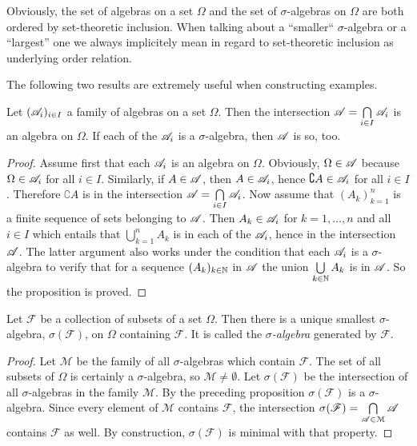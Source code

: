 \begin{remark}
  Obviously, the set of algebras on a set $\Omega$ and the set of $\sigma$-algebras on $\Omega$ are both ordered
  by set-theoretic inclusion. When talking about a ``smaller`` $\sigma$-algebra or a ``largest'' one we always
  implicitely mean in regard to set-theoretic inclusion as underlying order relation.
\end{remark}

The following two results are extremely useful when constructing examples.

\begin{proposition}
  Let $(\mathscr{A}_i)_{i\in I}$ a family of algebras on a set $\Omega$.
  Then the intersection
  $\mathscr{A} = \bigcap\limits_{i\in I} \mathscr{A}_i$ is an algebra on $\Omega$.
  If each of the $\mathscr{A}_i$ is a $\sigma$-algebra, then $\mathscr{A}$ is so, too. 
\end{proposition}
\begin{proof}
  Assume first that each $\mathscr{A}_i$ is an algebra on $\Omega$. 
  Obviously, $\Omega \in \mathscr{A}$ because  $\Omega \in \mathscr{A}_i$ for all $i\in I$.
  Similarly, if $A  \in \mathscr{A}$, then $A \in \mathscr{A}_i$, hence $\complement A \in \mathscr{A}_i$
  for all $i\in I$. Therefore $\complement A $ is in the intersection
  $\mathscr{A} = \bigcap\limits_{i\in I} \mathscr{A}_i$. Now assume that $(A_k)_{k=1}^n$ is a finite
  sequence of  sets belonging to $\mathscr{A}$. Then $A_k \in \mathscr{A}_i$  for $k=1,\ldots,n$ and all
  $i\in I$  which entails that $\bigcup\limits_{k=1}^n A_k$ is in each of the $\mathscr{A}_i$, hence in the
  intersection $\mathscr{A}$. The latter argument also works under the condition that each $\mathscr{A}_i$ is a $\sigma$-algebra
  to verify that for a sequence $(A_k)_{k\in\mathbb{N}}$  in $\mathscr{A}$ the union $\bigcup\limits_{k\in\mathbb{N}} A_k$
  is in $\mathscr{A}$. So the proposition is proved. 
\end{proof}


\begin{corollary}
  Let $\mathscr F$ be a collection of subsets of a set $\Omega$.  Then there is a unique smallest $\sigma$-algebra,
  $\sigma (\mathscr F)$, on $\Omega$ containing $\mathcal F$.  It is called the \emph{$\sigma$-algebra} generated by
  $\mathscr F$.
\end{corollary}

\begin{proof}
  Let ${\mathcal M}$ be the family of all $\sigma$-algebras which contain $\mathscr F$.  The set of all subsets of $\Omega$ is
  certainly a $\sigma$-algebra, so ${\mathcal M} \neq \emptyset$.  Let $\sigma (\mathscr F)$ be the intersection of all
  $\sigma$-algebras in the family ${\mathcal M}$.  By the preceding proposition $\sigma (\mathscr F)$ is a $\sigma$-algebra.
  Since every element of ${\mathcal M}$ contains $\mathscr F$, the intersection
  $\sigma (\mathscr F) = \bigcap\limits_{\mathscr{A}\in \mathcal{M}}\mathscr{A}$ contains $\mathscr F$ as well. By construction,
  $\sigma (\mathscr F)$ is minimal with that property.
\end{proof}

